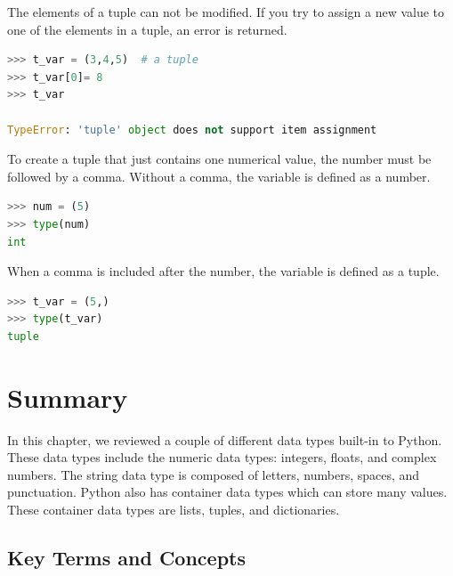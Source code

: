 \documentclass{book}
\begin{document}
The elements of a tuple can not be modified. If you try to assign a new
value to one of the elements in a tuple, an error is returned.

\begin{lstlisting}[language=Python]
>>> t_var = (3,4,5)  # a tuple
>>> t_var[0]= 8
>>> t_var

TypeError: 'tuple' object does not support item assignment
\end{lstlisting}

To create a tuple that just contains one numerical value, the number
must be followed by a comma. Without a comma, the variable is defined as
a number.

\begin{lstlisting}[language=Python]
>>> num = (5)
>>> type(num)
int
\end{lstlisting}

When a comma is included after the number, the variable is defined as a
tuple.

\begin{lstlisting}[language=Python]
>>> t_var = (5,)
>>> type(t_var)
tuple
\end{lstlisting}
    




    
        \newpage
        \section{Summary}\label{summary}

    




    
        In this chapter, we reviewed a couple of different data types built-in
to Python. These data types include the numeric data types: integers,
floats, and complex numbers. The string data type is composed of
letters, numbers, spaces, and punctuation. Python also has container
data types which can store many values. These container data types are
lists, tuples, and dictionaries.
    




    
        \subsection{Key Terms and Concepts}\label{key-terms-and-concepts}
    
\end{document}
